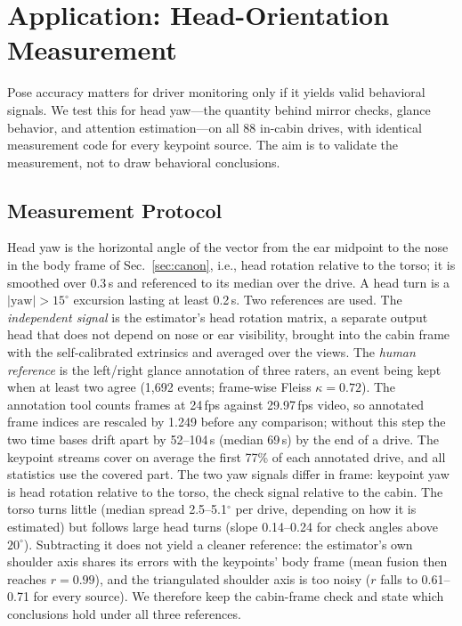 \documentclass[journal]{IEEEtran}
\begin{document}
\section{Application: Head-Orientation Measurement}
\label{sec:downstream}
Pose accuracy matters for driver monitoring only if it yields valid behavioral signals. We test this for head yaw---the quantity behind mirror checks, glance behavior, and attention estimation---on all 88 in-cabin drives, with identical measurement code for every keypoint source. The aim is to validate the measurement, not to draw behavioral conclusions.

\subsection{Measurement Protocol}
Head yaw is the horizontal angle of the vector from the ear midpoint to the nose in the body frame of Sec.~\ref{sec:canon}, i.e., head rotation relative to the torso; it is smoothed over 0.3\,s and referenced to its median over the drive. A head turn is a $|\mathrm{yaw}|>15^\circ$ excursion lasting at least 0.2\,s. Two references are used. The \emph{independent signal} is the estimator's head rotation matrix, a separate output head that does not depend on nose or ear visibility, brought into the cabin frame with the self-calibrated extrinsics and averaged over the views. The \emph{human reference} is the left/right glance annotation of three raters, an event being kept when at least two agree (1{,}692 events; frame-wise Fleiss $\kappa=0.72$). The annotation tool counts frames at 24\,fps against 29.97\,fps video, so annotated frame indices are rescaled by 1.249 before any comparison; without this step the two time bases drift apart by 52--104\,s (median 69\,s) by the end of a drive. The keypoint streams cover on average the first 77\% of each annotated drive, and all statistics use the covered part. The two yaw signals differ in frame: keypoint yaw is head rotation relative to the torso, the check signal relative to the cabin. The torso turns little (median spread 2.5--5.1$^\circ$ per drive, depending on how it is estimated) but follows large head turns (slope 0.14--0.24 for check angles above $20^\circ$). Subtracting it does not yield a cleaner reference: the estimator's own shoulder axis shares its errors with the keypoints' body frame (mean fusion then reaches $r=0.99$), and the triangulated shoulder axis is too noisy ($r$ falls to 0.61--0.71 for every source). We therefore keep the cabin-frame check and state which conclusions hold under all three references.
\end{document}
